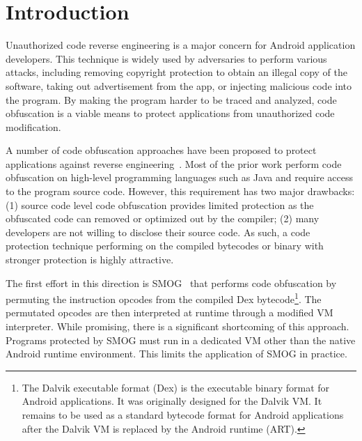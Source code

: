 \section{Introduction}

Unauthorized code reverse engineering is a major concern for Android
application developers. This technique is widely used by adversaries to
perform various attacks, including removing copyright protection to obtain an
illegal copy of the software, taking out advertisement from the app, or
injecting malicious code into the program. By making the program harder to be
traced and analyzed, code obfuscation is a viable means to
protect applications from unauthorized code modification.


A number of code obfuscation approaches have been proposed to protect
applications against reverse engineering~\cite{06,07,08,09}. Most of the
prior work perform code obfuscation on high-level programming languages such
as Java and require access to the program source code. However, this
requirement has two major drawbacks: (1) source code level code obfuscation
provides limited protection as the obfuscated code can removed or
optimized out by the compiler; (2) many developers are not willing to disclose
their source code.  As such, a code
protection technique performing on the compiled bytecodes or binary with stronger protection is highly attractive.


The first effort in this direction is SMOG~\cite{10} that performs code
obfuscation by permuting the instruction opcodes from the compiled Dex
bytecode\footnote{The Dalvik executable format (Dex) is the executable binary format for Android
applications. It was originally designed for the Dalvik VM. It
remains to be used as a standard bytecode format for Android applications after the Dalvik VM is replaced by the Android runtime (ART).}. The permutated opcodes are then
interpreted at runtime through a modified VM interpreter. While promising,
there is a significant shortcoming of this approach. Programs protected
by SMOG must run in a dedicated VM other than the native Android runtime 
environment.  This limits the application of SMOG in practice. 


